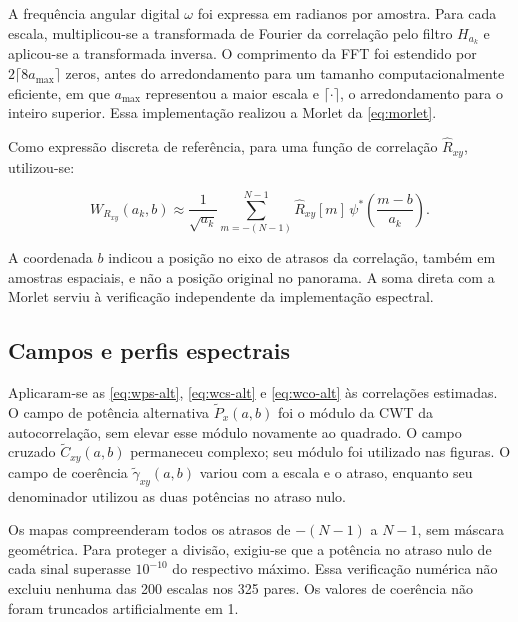 \noindent
A frequência angular digital $\omega$ foi expressa em radianos por amostra.
Para cada escala, multiplicou-se a transformada de Fourier da correlação pelo
filtro $H_{a_k}$ e aplicou-se a transformada inversa. O comprimento da FFT foi
estendido por $2\lceil8a_{\max}\rceil$ zeros, antes do arredondamento para um
tamanho computacionalmente eficiente, em que $a_{\max}$ representou a maior
escala e $\lceil\cdot\rceil$, o arredondamento para o inteiro superior.
Essa implementação realizou a Morlet da \autoref{eq:morlet}.

Como expressão discreta de referência, para uma função de correlação
$\widehat R_{xy}$, utilizou-se:

\begin{equation}\label{eq:cwt-disc}
  W_{R_{xy}}(a_k,b)\approx\frac{1}{\sqrt{a_k}}
     \sum_{m=-(N-1)}^{N-1}\widehat R_{xy}[m]\,
     \psi^*\!\left(\frac{m-b}{a_k}\right).
\end{equation}

\noindent
A coordenada $b$ indicou a posição no eixo de atrasos da correlação, também em
amostras espaciais, e não a posição original no panorama. A soma direta com a
Morlet serviu à verificação independente da implementação espectral.

\subsection{Campos e perfis espectrais}\label{sec:met-analise}

Aplicaram-se as \autoref{eq:wps-alt}, \autoref{eq:wcs-alt} e
\autoref{eq:wco-alt} às correlações estimadas. O campo de potência alternativa
$\widetilde P_x(a,b)$ foi o módulo da CWT da autocorrelação, sem elevar esse módulo
novamente ao quadrado. O campo cruzado $\widetilde C_{xy}(a,b)$ permaneceu complexo;
seu módulo foi utilizado nas figuras. O campo de coerência
$\widetilde\gamma_{xy}(a,b)$ variou com a escala e o atraso, enquanto seu denominador
utilizou as duas potências no atraso nulo.

Os mapas compreenderam todos os atrasos de $-(N-1)$ a $N-1$, sem máscara
geométrica. Para proteger a divisão, exigiu-se que a potência no atraso nulo de
cada sinal superasse $10^{-10}$ do respectivo máximo. Essa verificação numérica
não excluiu nenhuma das 200 escalas nos 325 pares. Os valores de coerência não
foram truncados artificialmente em 1.

